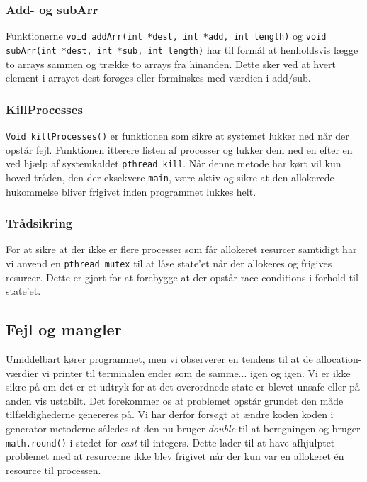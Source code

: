 \documentclass[main.tex]{subfile}
\begin{document}
\subsubsection{Add- og subArr}
Funktionerne \texttt{void addArr(int *dest, int *add, int length)} og \texttt{void subArr(int *dest, int *sub, int length)} har til formål at henholdsvis lægge to arrays sammen og trække to arrays fra hinanden. Dette sker ved at hvert element i arrayet dest forøges eller forminskes med værdien i add/sub. 

\subsubsection{KillProcesses}
\texttt{Void killProcesses()} er funktionen som sikre at systemet lukker ned når der opstår fejl. Funktionen itterere listen af processer og lukker dem ned en efter en ved hjælp af systemkaldet \texttt{pthread\_kill}. Når denne metode har kørt vil kun hoved tråden, den der eksekvere \texttt{main}, være aktiv og sikre at den allokerede hukommelse bliver frigivet inden programmet lukkes helt.

\subsubsection{Trådsikring}
For at sikre at der ikke er flere processer som får allokeret resurcer samtidigt har vi anvend en \texttt{pthread\_mutex} til at låse state'et når der allokeres og frigives resurcer. Dette er gjort for at forebygge at der opstår race-conditions i forhold til state'et.

\subsection{Fejl og mangler}
Umiddelbart kører programmet, men vi observerer en tendens til at de allocation-værdier vi printer til terminalen ender som de samme... igen og igen. Vi er ikke sikre på om det er et udtryk for at det overordnede state er blevet unsafe eller på anden vis ustabilt. Det forekommer os at problemet opstår grundet den måde tilfældighederne genereres på. Vi har derfor forsøgt at ændre koden koden i generator metoderne således at den nu bruger \emph{double} til at beregningen og bruger \texttt{math.round()} i stedet for \emph{cast} til integers. Dette lader til at have afhjulptet problemet med at resurcerne ikke blev frigivet når der kun var en allokeret én resource til processen.\\
\end{document}
